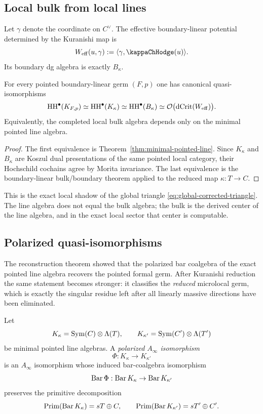\subsection{Local bulk from local lines}

Let $\gamma$ denote the coordinate on $C^\vee$. The effective boundary-linear potential determined by the Kuranishi map is
\[
W_{\eff}(u,\gamma):=\langle \gamma,\kappaChHodge(u)\rangle.
\]
Its boundary dg algebra is exactly $B_\kappa$.

\begin{theorem}%
For every pointed boundary-linear germ $(F,p)$ one has canonical quasi-isomorphisms
\[
\operatorname{HH}^\bullet(K_{F,p})
\simeq
\operatorname{HH}^\bullet(K_\kappa)
\simeq
\operatorname{HH}^\bullet(B_\kappa)
\simeq
\mathcal O\bigl(\operatorname{dCrit}(W_{\mathrm{eff}})\bigr).
\]
Equivalently, the completed local bulk algebra depends only on the minimal pointed line algebra.
\end{theorem}

\begin{proof}
The first equivalence is Theorem~\ref{thm:minimal-pointed-line}. Since $K_\kappa$ and $B_\kappa$ are Koszul dual presentations of the same pointed local category, their Hochschild cochains agree by Morita invariance. The last equivalence is the boundary-linear bulk/boundary theorem applied to the reduced map $\kappa:T\to C$.
\end{proof}

\begin{remark}
This is the exact local shadow of the global triangle \eqref{eq:global-corrected-triangle}. The line algebra does not equal the bulk algebra; the bulk is the derived center of the line algebra, and in the exact local sector that center is computable.
\end{remark}

\subsection{Polarized quasi-isomorphisms}

The reconstruction theorem showed that the polarized bar coalgebra of the exact pointed line algebra recovers the pointed formal germ. After Kuranishi reduction the same statement becomes stronger: it classifies the \emph{reduced} microlocal germ, which is exactly the singular residue left after all linearly massive directions have been eliminated.

\begin{definition}
Let
\[
K_\kappa=\operatorname{Sym}(C)\otimes \Lambda(T),
\qquad
K_{\kappa'}=\operatorname{Sym}(C')\otimes \Lambda(T')
\]
be minimal pointed line algebras. A \emph{polarized $A_\infty$ isomorphism}
\[
\Phi:K_\kappa\longrightarrow K_{\kappa'}
\]
is an $A_\infty$ isomorphism whose induced bar-coalgebra isomorphism
\[
\operatorname{Bar} \Phi:\operatorname{Bar} K_\kappa\to \operatorname{Bar} K_{\kappa'}
\]
preserves the primitive decomposition
\[
\mathrm{Prim}(\operatorname{Bar} K_\kappa)=sT\oplus C,
\qquad
\mathrm{Prim}(\operatorname{Bar} K_{\kappa'})=sT'\oplus C'.
\]
\end{definition}

